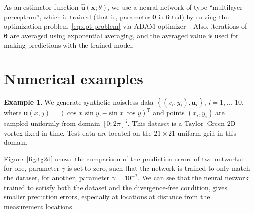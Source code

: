 \documentclass[pamm,a4paper,fleqn]{w-art}
\newcommand{\T}{\ensuremath{\text{T}}}
\renewcommand{\vec}[1]{\boldsymbol{#1}}
\begin{document}
As an estimator function $\hat{\vec u}(\vec x; \theta)$, we use a neural network
of type ``multilayer perceptron''\cite{GoodfellowEtAl2016}, which is trained
(that is, parameter $\vec\theta$ is fitted) by solving 
the optimization problem~\eqref{eq:opt-problem} via ADAM
optimizer~\cite{KingmaBa2014}.
Also, iterations of $\vec\theta$ are averaged using exponential
averaging, and the averaged value is used for making predictions with the
trained model.

\section{Numerical examples}

\textbf{Example 1}.
We generate synthetic noiseless data
  $\left\{(x_i, y_i), \vec{u}_i\right\}$, $i = 1, \dots, 10$,
where $\vec u(x, y) = ( \cos x \, \sin y, -\sin x \, \cos y)^\T$
and points $(x_i, y_i)$ are sampled uniformly from domain $[0; 2\pi]^2$.
This dataset is a Taylor--Green 2D vortex fixed in time.
Test data are located on the $21\times21$ uniform grid in this domain.

Figure~\ref{fig:tg2d} shows the comparison of the prediction errors of two
networks: for one, parameter $\gamma$ is set to zero, such that the network is
trained to only match the dataset, for another, parameter $\gamma = 10^{-2}$.
We can see that the neural network trained to satisfy both  the dataset and the
divergence-free condition, gives smaller prediction errors, especially at
locations at distance from the measurement locations.
\end{document}
